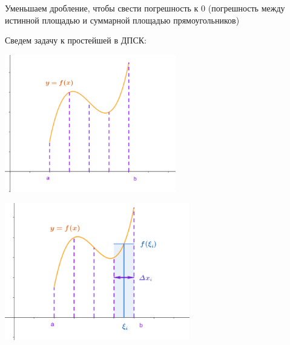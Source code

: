 \documentclass[12pt]{article}
\begin{document}
    Уменьшаем дробление, чтобы свести погрешность к 0 (погрешность между истинной площадью и суммарной площадью прямоугольников)

    Сведем задачу к простейшей в ДПСК:

    \vspace{10mm}


    \begin{multicols}{2}
        \includegraphics[height=6cm]{images/calculus_2024_02_07_2}

        \includegraphics[height=6cm]{images/calculus_2024_02_07_3}
    \end{multicols}
\end{document}
